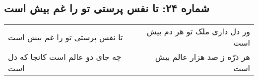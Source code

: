 \begin{center}
\section*{شماره ۲۴: تا نفس پرستی تو را غم بیش است}
\label{sec:024}
\begin{longtable}{l p{0.5cm} r}
تا نفس پرستی تو را غم بیش است
&&
ور دل داری ملک تو هر دم بیش است
\\
چه جای دو عالم است کانجا که دل است
&&
هر ذرّه ز صد هزار عالم بیش است
\\
\end{longtable}
\end{center}
